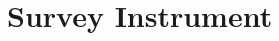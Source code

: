 \documentclass{article}
\begin{document}
% 
% 
% 

% 
% 
% 

% 
% 
% 

% 
% 
% 


\section{Survey Instrument}


\end{document}
